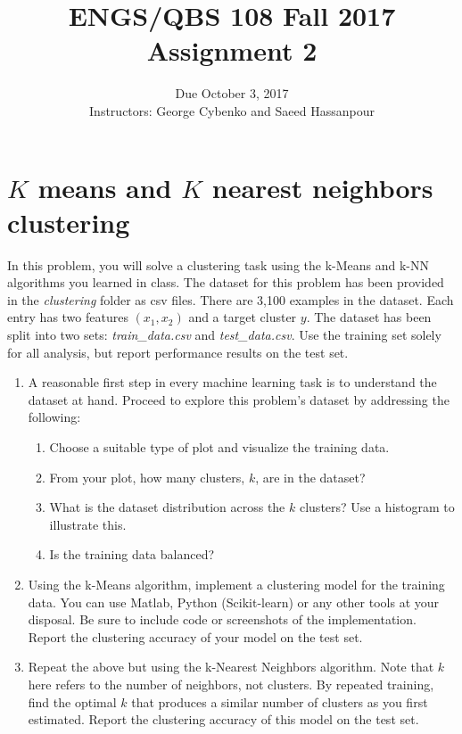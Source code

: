 \documentclass[12pt]{article}
\newenvironment{problem}[2][Problem:]{\begin{trivlist}
\item[\hskip \labelsep {\bfseries #1}\hskip \labelsep {\bfseries #2.}]}{\end{trivlist}}
\begin{document}
 


\title{ENGS/QBS 108 Fall 2017 Assignment 2}
\author{Due October 3, 2017 \\ Instructors: George Cybenko and Saeed Hassanpour}
\date{}
\maketitle

\pagebreak

\section{$K$ means and $K$ nearest neighbors clustering}
\begin{problem}{Clustering [13 points]}
In this problem, you will solve a clustering task using the k-Means and k-NN algorithms you learned in class. The dataset for this problem has been provided in the \textit{clustering} folder as csv files. There are 3,100 examples in the dataset. Each entry has two features $(x_1,x_2)$ and a target cluster $y$. The dataset has been split into two sets: \textit{train\_data.csv} and \textit{test\_data.csv}. Use the training set solely for all analysis, but report performance results on the test set.

\begin{enumerate}
    \item A reasonable first step in every machine learning task is to understand the dataset at hand. Proceed to explore this problem's dataset by addressing the following:
    \begin{enumerate}
            \item Choose a suitable type of plot and visualize the training data.
            \item From your plot, how many clusters, $k$, are in the dataset? 
            \item What is the dataset distribution across the $k$ clusters? Use a histogram to illustrate this.
            \item Is the training data balanced?
    \end{enumerate}

    \item Using the k-Means algorithm, implement a clustering model for the training data. You can use Matlab, Python (Scikit-learn) or any other tools at your disposal. Be sure to include code or screenshots of the implementation. Report the clustering accuracy of your model on the test set.

    \item Repeat the above but using the k-Nearest Neighbors algorithm. Note that $k$ here refers to the number of neighbors, not clusters. By repeated training, find the optimal $k$ that produces a similar number of clusters as you first estimated. Report the clustering accuracy of this model on the test set. 
\end{enumerate}
\end{problem}
\end{document}
